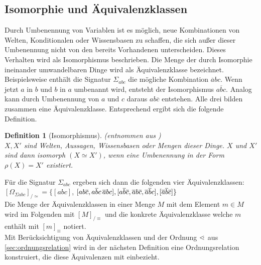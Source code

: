 \documentclass[12pt,a4paper]{article}
\newtheorem{theorem}{Definition}
\newcommand\dotl{\mathrel{%
    \mathchoice{\QEQ}{\QEQ}{\QEQ}{\QEQ}%
}}
\def\QEQ{{%
    \setbox0\hbox{<}%
    \rlap{\hbox to \wd0{\hss \raisebox {0.1pt}{$\ \cdot$\hss}}}\box0
}}
\begin{document}
\subsection{Isomorphie und Äquivalenzklassen}
\label{sec:äquivalenz-wissensbasen}
Durch Umbenennung von Variablen ist es möglich, neue Kombinationen von Welten, Konditionalen oder Wissensbasen zu schaffen, die sich außer dieser Umbenennung nicht von den bereits Vorhandenen unterscheiden. Dieses Verhalten wird als Isomorphismus beschrieben. Die Menge der durch Isomorphie ineinander umwandelbaren Dinge wird als Äquivalenzklasse bezeichnet. \\
Beispielsweise enthält die Signatur $\Sigma_{abc}$ die mögliche Kombination $\overline{a}bc$. Wenn jetzt $a$ in $b$ und $b$ in $a$ umbenannt wird, entsteht der Isomorphismus $a\overline{b}c$. Analog kann durch Umbenennung von $a$ und $c$ daraus $ab\overline{c}$ entstehen. Alle drei bilden zusammen eine Äquivalenzklasse. Entsprechend ergibt sich die folgende Definition.
\begin{theorem}[Isomorphismus](entnommen aus \cite{beierle19}) \ \\
$X, X'$ sind Welten, Aussagen, Wissensbasen oder Mengen dieser Dinge. $X$ und $X'$ sind dann isomorph $(X \simeq X')$, wenn eine Umbenennung in der Form $\rho(X) = X'$ existiert.
\end{theorem}
Für die Signatur $\Sigma_{abc}$ ergeben sich dann die folgenden vier Äquivalenzklassen: \\
$[\Omega_{\Sigma abc}]_{/\simeq}=\{[abc]$, $[ab\overline{c}, a\overline{b}c\, \overline{a}bc], [a\overline{b}\overline{c}, \overline{a\\}b\overline{c}, \overline{a}\overline{b}c], [\overline{a}\overline{b}\overline{c}]\}$ \\
Die Menge der Äquivalenzklassen in einer Menge $M$ mit dem Element $m \in M$ wird im Folgenden mit $[M]_{/\equiv}$ und die konkrete Äquivalenzklasse welche $m$ enthält mit $[m]_\equiv$ notiert.\\
Mit Berücksichtigung von Äquivalenzklassen und der Ordnung $\dotl$ aus \autoref{sec:ordnungsrelation} wird in der nächsten Definition eine Ordnungsrelation konstruiert, die diese Äquivalenzen mit einbezieht.
\end{document}
